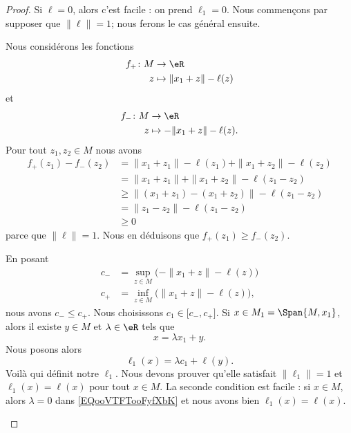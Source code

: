 	\begin{proof}
		Si \( \ell=0\), alors c'est facile : on prend \( \ell_1=0\). Nous commençons par supposer que \( \| \ell \|=1\); nous ferons le cas général ensuite.
		\begin{subproof}
			Nous considérons les fonctions
			\begin{equation}
				\begin{aligned}
					f_+\colon M & \to \eR                     \\
					z           & \mapsto \| x_1+z \|-\ell(z)
				\end{aligned}
			\end{equation}
			et
			\begin{equation}
				\begin{aligned}
					f_-\colon M & \to \eR                       \\
					z           & \mapsto -\| x_1+z \|-\ell(z).
				\end{aligned}
			\end{equation}
			Pour tout \( z_1,z_2\in M\) nous avons
			\begin{subequations}
				\begin{align}
					f_+(z_1)-f_-(z_2) & =\| x_1+z_1 \|-\ell(z_1)+\| x_1+z_2 \|-\ell(z_2) \\
					                  & =\| x_1+z_1 \|+\| x_1+z_2 \|-\ell(z_1-z_2)       \\
					                  & \geq \| (x_1+z_1)-(x_1+z_2) \|-\ell(z_1-z_2)     \\
					                  & =\| z_1-z_2  \|-\ell(z_1-z_2)                    \\
					                  & \geq 0
				\end{align}
			\end{subequations}
			parce que \( \| \ell \|=1\). Nous en déduisons que \( f_+(z_1)\geq f_-(z_2)\).


			En posant
			\begin{subequations}
				\begin{align}
					c_- & =\sup_{z\in M}\big( -\| x_1+z \|-\ell(z) \big)  \\
					c_+ & =\inf_{z\in M}\big(  \| x_1+z \|-\ell(z) \big),
				\end{align}
			\end{subequations}
			nous avons \( c_-\leq c_+\). Nous choisissons \( c_1\in \mathopen[ c_- , c_+ \mathclose]\).
			\spitem[La définition]
			Si \( x\in M_1=\Span{M,x_1}\), alors il existe \( y\in M\) et \( \lambda\in \eR\) tels que
			\begin{equation}
				x=\lambda x_1+y.
			\end{equation}
			Nous posons alors
			\begin{equation}        \label{EQooVTFTooFyfXbK}
				\ell_1(x)=\lambda c_1+\ell(y).
			\end{equation}
			Voilà qui définit notre \( \ell_1\). Nous devons prouver qu'elle satisfait \( \| \ell_1 \|=1\) et \( \ell_1(x)=\ell(x)\) pour tout \( x\in M\). La seconde condition est facile : si \( x\in M\), alors \( \lambda=0\) dans \eqref{EQooVTFTooFyfXbK} et nous avons bien \( \ell_1(x)=\ell(x)\).


\end{subproof}
\end{proof}
